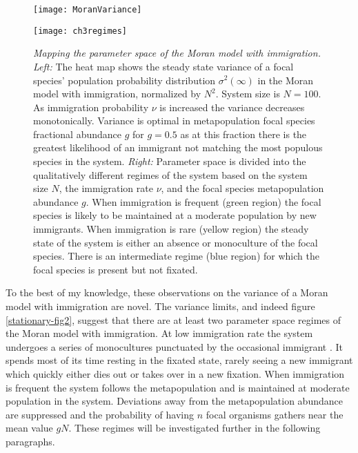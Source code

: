 \begin{figure}[h]
	\centering
	\begin{minipage}{0.49\linewidth}
		\centering
		\texttt{[image: MoranVariance]}
	\end{minipage}
	\begin{minipage}{0.49\linewidth}
		\centering
		\texttt{[image: ch3regimes]}
	\end{minipage}
	\caption{\emph{Mapping the parameter space of the Moran model with immigration.}
		\emph{Left:} The heat map shows the steady state variance of a focal species' population probability distribution $\sigma^2(\infty)$ in the Moran model with immigration, normalized by $N^2$. System size is $N=100$. As immigration probability $\nu$ is increased the variance decreases monotonically. Variance is optimal in metapopulation focal species fractional abundance $g$ for $g=0.5$ as at this fraction there is the greatest likelihood of an immigrant not matching the most populous species in the system. 
		\emph{Right:} Parameter space is divided into the qualitatively different regimes of the system based on the system size $N$, the immigration rate $\nu$, and the focal species metapopulation abundance $g$. When immigration is frequent (green region) the focal species is likely to be maintained at a moderate population by new immigrants. When immigration is rare (yellow region) the steady state of the system is either an absence or monoculture of the focal species. There is an intermediate regime (blue region) for which the focal species is present but not fixated. 
	} \label{biodiversity-regimes}
\end{figure}

To the best of my knowledge, these observations on the variance of a Moran model with immigration are novel. 
The variance limits, and indeed figure \ref{stationary-fig2}, suggest that there are at least two parameter space regimes of the Moran model with immigration. 
At low immigration rate the system undergoes a series of monocultures punctuated by the occasional immigrant \cite{Desai2007}. 
It spends most of its time resting in the fixated state, rarely seeing a new immigrant which quickly either dies out or takes over in a new fixation. 
When immigration is frequent the system follows the metapopulation and is maintained at moderate population in the system. 
Deviations away from the metapopulation abundance are suppressed and the probability of having $n$ focal organisms gathers near the mean value $g N$. 
These regimes will be investigated further in the following paragraphs. 

